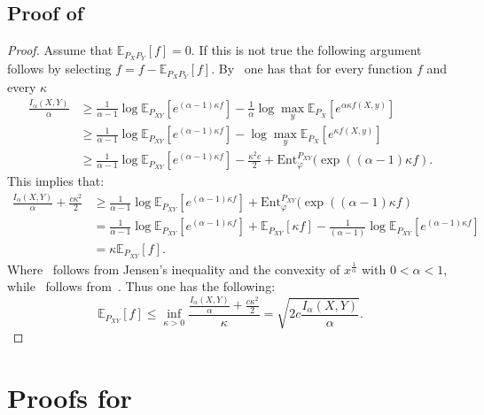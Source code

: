 \documentclass{article}
\numberwithin{theorem}{section}
\numberwithin{example}{section}
\numberwithin{remark}{section}
\numberwithin{definition}{section}
\newcommand{\E}{\mathbb{E}}
\begin{document}
\subsection{Proof of~}\label{app:proof:thm:TpcIneqIalpha}
\begin{proof}
    Assume that $\mathbb{E}_{P_XP_Y}[f]=0$. If this is not true the following argument follows by selecting $f=f-\mathbb{E}_{P_XP_Y}[f]$.
     By~ one has that for every function $f$ and every $\kappa$
    \begin{align}
    \frac{I_\alpha(X,Y)}{\alpha} &\ge \frac{1}{\alpha-1} \log \E_{P_{XY}}\left[e^{(\alpha-1)\kappa f}\right] -  \frac1\alpha \log \max_y \E_{P_X}\left[e^{\alpha \kappa f(X,y)}\right] \\
    &\geq \frac{1}{\alpha-1} \log \E_{P_{XY}}\left[e^{(\alpha-1)\kappa f}\right] -   \log \max_y \E_{P_X}\left[e^{\kappa f(X,y)}\right]\\
    &\geq \frac{1}{\alpha-1} \log \E_{P_{XY}}\left[e^{(\alpha-1)\kappa f}\right] - \frac{\kappa^2 c}{2} + \text{Ent}_\varphi^{P_{XY}}(\exp((\alpha-1) \kappa f) .
\end{align}
This implies that:
\begin{align}
    \frac{I_\alpha(X,Y)}{\alpha} + \frac{c\kappa^2 }{2} &\geq \frac{1}{\alpha-1} \log \E_{P_{XY}}\left[e^{(\alpha-1)\kappa f}\right]+  \text{Ent}_\varphi^{P_{XY}}(\exp((\alpha-1)\kappa f)\label{eq:jensenTpc}\\
    &= \frac{1}{\alpha-1} \log \E_{P_{XY}}\left[e^{(\alpha-1)\kappa f}\right]+\mathbb{E}_{P_{XY}}[\kappa f]-\frac{1}{(\alpha-1)}\log\mathbb{E}_{P_{XY}}\left[e^{(\alpha-1) \kappa f}\right]\label{eq:assumptionUseTpc} \\
    &= \kappa \mathbb{E}_{P_{XY}}[f].
\end{align}
Where~ follows from Jensen's inequality and the convexity of $x^\frac1\alpha$ with $0<\alpha<1$, while~ follows from~.
Thus one has the following:
\begin{equation}
    \mathbb{E}_{P_{XY}}[f] \leq \inf_{\kappa>0} \frac{\frac{I_\alpha(X,Y)}{\alpha}+\frac{c\kappa^2}{2}}{\kappa} = \sqrt{2c \frac{I_\alpha(X,Y)}{\alpha}}.
\end{equation}
\end{proof}

\section{Proofs for~}
\end{document}
